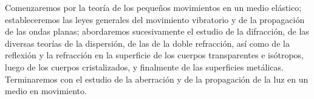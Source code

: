 Comenzaremos por la teoría de los pequeños movimientos en un medio
elástico; estableceremos las leyes generales del movimiento vibratorio y
de la propagación de las ondas planas; abordaremos sucesivamente el
estudio de la difracción, de las diversas teorías de la dispersión, de las
de la doble refracción, así como de la reflexión y la refracción en la
superficie de los cuerpos transparentes e isótropos, luego de los cuerpos
cristalizados, y finalmente de las superficies metálicas. Terminaremos con
el estudio de la aberración y de la propagación de la luz en un medio en
movimiento.

